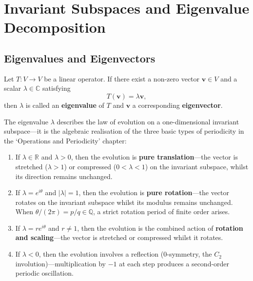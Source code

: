 \section{\texorpdfstring{Invariant Subspaces and Eigenvalue Decomposition}{Invariant Subspaces and Eigenvalue Decomposition}}

\subsection{\texorpdfstring{Eigenvalues and Eigenvectors}{Eigenvalues and Eigenvectors}}

\begin{definition}\label{def:eigenvalue_eigenvector}
Let $T: V \to V$ be a linear operator. If there exist a non-zero vector $\mathbf{v} \in V$ and a scalar $\lambda \in \mathbb{C}$ satisfying
\[
T(\mathbf{v}) = \lambda \mathbf{v},
\]
then $\lambda$ is called an \textbf{eigenvalue} of $T$ and $\mathbf{v}$ a corresponding \textbf{eigenvector}.

The eigenvalue $\lambda$ describes the law of evolution on a one-dimensional invariant subspace---it is the algebraic realisation of the three basic types of periodicity in the `Operations and Periodicity' chapter:
\begin{enumerate}[label=(\roman*)]
    \item If $\lambda \in \mathbb{R}$ and $\lambda > 0$, then the evolution is \textbf{pure translation}---the vector is stretched ($\lambda > 1$) or compressed ($0 < \lambda < 1$) on the invariant subspace, whilst its direction remains unchanged.
    \item If $\lambda = e^{i\theta}$ and $|\lambda| = 1$, then the evolution is \textbf{pure rotation}---the vector rotates on the invariant subspace whilst its modulus remains unchanged. When $\theta/(2\pi) = p/q \in \mathbb{Q}$, a strict rotation period of finite order arises.
    \item If $\lambda = re^{i\theta}$ and $r \neq 1$, then the evolution is the combined action of \textbf{rotation and scaling}---the vector is stretched or compressed whilst it rotates.
    \item If $\lambda < 0$, then the evolution involves a reflection ($0$-symmetry, the $C_2$ involution)---multiplication by $-1$ at each step produces a second-order periodic oscillation.
\end{enumerate}
\end{definition}


